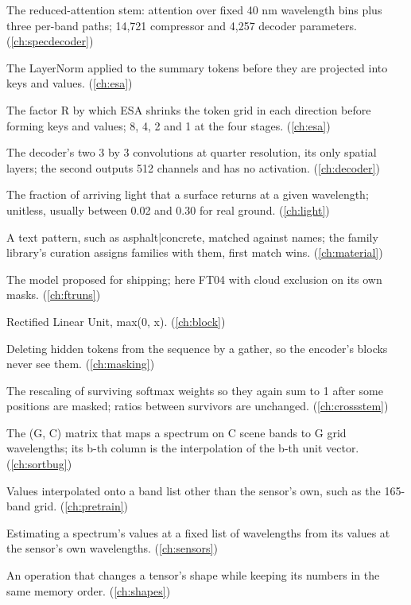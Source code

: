 \begin{description}[style=nextline,leftmargin=1.2em,font=\normalfont\bfseries]
\item[Reduced stem] The reduced-attention stem: attention over fixed 40 nm wavelength bins plus three per-band paths; 14,721 compressor and 4,257 decoder parameters. (\cref{ch:specdecoder})
\item[Reduction LayerNorm] The LayerNorm applied to the summary tokens before they are projected into keys and values. (\cref{ch:esa})
\item[Reduction ratio] The factor R by which ESA shrinks the token grid in each direction before forming keys and values; 8, 4, 2 and 1 at the four stages. (\cref{ch:esa})
\item[Refine convolutions] The decoder's two 3 by 3 convolutions at quarter resolution, its only spatial layers; the second outputs 512 channels and has no activation. (\cref{ch:decoder})
\item[Reflectance] The fraction of arriving light that a surface returns at a given wavelength; unitless, usually between 0.02 and 0.30 for real ground. (\cref{ch:light})
\item[Regular expression] A text pattern, such as asphalt|concrete, matched against names; the family library's curation assigns families with them, first match wins. (\cref{ch:material})
\item[Release candidate] The model proposed for shipping; here FT04 with cloud exclusion on its own masks. (\cref{ch:ftruns})
\item[ReLU] Rectified Linear Unit, max(0, x). (\cref{ch:block})
\item[Remove tokens] Deleting hidden tokens from the sequence by a gather, so the encoder's blocks never see them. (\cref{ch:masking})
\item[Renormalisation] The rescaling of surviving softmax weights so they again sum to 1 after some positions are masked; ratios between survivors are unchanged. (\cref{ch:crossstem})
\item[Resample matrix] The (G, C) matrix that maps a spectrum on C scene bands to G grid wavelengths; its b-th column is the interpolation of the b-th unit vector. (\cref{ch:sortbug})
\item[Resampled band list] Values interpolated onto a band list other than the sensor's own, such as the 165-band grid. (\cref{ch:pretrain})
\item[Resampling] Estimating a spectrum's values at a fixed list of wavelengths from its values at the sensor's own wavelengths. (\cref{ch:sensors})
\item[Reshape] An operation that changes a tensor's shape while keeping its numbers in the same memory order. (\cref{ch:shapes})

\end{description}
